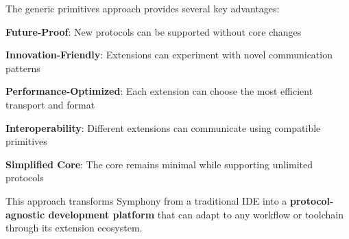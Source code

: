 The generic primitives approach provides several key advantages:

\begin{compactlist}
    \item \textbf{Future-Proof}: New protocols can be supported without core changes
    \item \textbf{Innovation-Friendly}: Extensions can experiment with novel communication patterns
    \item \textbf{Performance-Optimized}: Each extension can choose the most efficient transport and format
    \item \textbf{Interoperability}: Different extensions can communicate using compatible primitives
    \item \textbf{Simplified Core}: The core remains minimal while supporting unlimited protocols
\end{compactlist}

\begin{alertbox}
This approach transforms Symphony from a traditional IDE into a \textbf{protocol-agnostic development platform} that can adapt to any workflow or toolchain through its extension ecosystem.
\end{alertbox}
